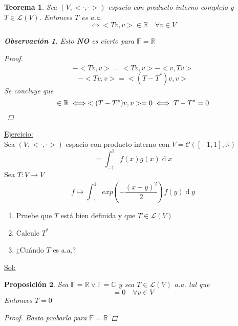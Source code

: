 \documentclass[11pt]{book}
\renewcommand{\d}[1]{\ensuremath{\operatorname{d}\!{#1}}}
\newcommand{\set}[1]{\mathbb{#1}}
\newcommand{\func}[5]{#1:#2\xrightarrow[#5]{#4}#3}
\newtheorem{thm}{Teorema}[section]
\newtheorem{prop}[thm]{Proposición}
\theoremstyle{definition}
\newtheorem{obs}{Observación}[section]
\begin{document}
\begin{thm}
	Sea $(V,<\cdot,\cdot>)$ espacio con producto interno complejo y $T\in\mathcal{L}(V)$. Entonces $T$ es a.a.
	\[\iff <Tv,v>\in\set{R}\quad\forall v\in V\]
	\begin{obs}
		Esto \textbf{NO} es cierto para $\set{F}=\set{R}$
	\end{obs}
	\begin{proof}
		\[<Tv,v>-\overline{<Tv,v>}=<Tv,v>-<v,Tv>\]
		\[<Tv,v>-\overline{<Tv,v>}=<(T-T^*)v,v>\]
		Se concluye que
		\[<Tv,v>\in\set{R}\iff <(T-T^*)v,v>=0\iff T-T^*=0\qedhere\]
	\end{proof}
\end{thm}
\underline{Ejercicio:}\\
Sea $(V,<\cdot,\cdot>)$ espacio con producto interno con $V=\mathcal{C}([-1,1],\set{R})$
\[<f,g>=\int^1_{-1}f(x)g(x)\d{x}\]
Sea $\func{T}{V}{V}{}{}$
\[f\mapsto\int^1_{-1}exp(-\frac{(x-y)^2}{2})f(y)\d{y}\]
\begin{enumerate}[label=\alph*)]
	\item Pruebe que $T$ está bien definida y que $T\in\mathcal{L}(V)$

	\item Calcule $T^*$

	\item ¿Cuándo $T$ es a.a.?
\end{enumerate}
\underline{Sol:}
\begin{prop}
	Sea $\set{F}=\set{R}\vee\set{F}=\set{C}$ y sea $T\in\mathcal{L}(V)$ a.a. tal que
	\[<Tv,v>=0\quad\forall v\in V\]
	Entonces $T=0$
	\begin{proof}
		Basta probarlo para $\set{F}=\set{R}$
	\end{proof}
\end{prop}
\end{document}
